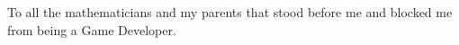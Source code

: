 
To all the mathematicians and my parents that stood before me and blocked me from being a Game Developer.